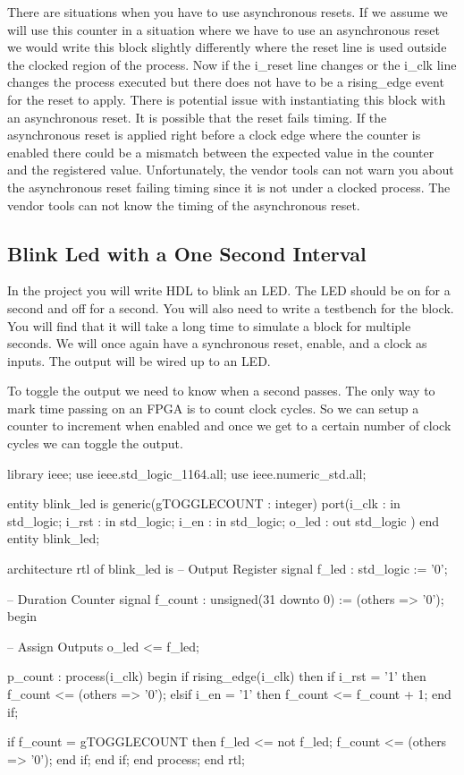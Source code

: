 There are situations when you have to use asynchronous resets. If we assume we will use this counter in a situation where we have to use an asynchronous reset we would write this block slightly differently where the reset line is used outside the clocked region of the process. Now if the i\_reset line changes or the i\_clk line changes the process executed but there does not have to be a rising\_edge event for the reset to apply. There is potential issue with instantiating this block with an asynchronous reset. It is possible that the reset fails timing. If the asynchronous reset is applied right before a clock edge where the counter is enabled there could be a mismatch between the expected value in the counter and the registered value. Unfortunately, the vendor tools can not warn you about the asynchronous reset failing timing since it is not under a clocked process. The vendor tools can not know the timing of the asynchronous reset.	
	
\subsection{Blink Led with a One Second Interval}

In the project you will write \ac{HDL} to blink an LED. The LED should be on for a second and off for a second. You will also need to write a testbench for the block. You will find that it will take a long time to simulate a block for multiple seconds. We will once again have a synchronous reset, enable, and a clock as inputs. The output will be wired up to an \ac{LED}.

To toggle the output we need to know when a second passes. The only way to mark time passing on an \ac{FPGA} is to count clock cycles. So we can setup a counter to increment when enabled and once we get to a certain number of clock cycles we can toggle the output. 

\begin{VHDLlisting}[tabsize=8]
library ieee;
  use ieee.std_logic_1164.all;
  use ieee.numeric_std.all;
  
entity blink_led is
generic(gTOGGLECOUNT : integer)
port(i_clk   : in    std_logic;
     i_rst   : in    std_logic;
     i_en    : in    std_logic;
     o_led   :   out std_logic	
)
end entity blink_led;

architecture rtl of blink_led is
    -- Output Register
    signal f_led   : std_logic := '0';

    -- Duration Counter
    signal f_count : unsigned(31 downto 0) := (others => '0');
begin

    -- Assign Outputs
    o_led <= f_led;

    p_count : process(i_clk)
    begin
        if rising_edge(i_clk) then
            if i_rst = '1' then
                f_count <= (others => '0');
            elsif i_en = '1' then
                f_count <= f_count + 1;
            end if;	

            if f_count = gTOGGLECOUNT then
                f_led <= not f_led;
                f_count <= (others => '0');
            end if;			
        end if;
    end process;
end rtl;

\end{VHDLlisting}

